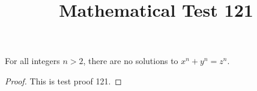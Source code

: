 \documentclass{amsart}
\begin{document}
\title{Mathematical Test 121}
\begin{theorem}
For all integers $n > 2$, there are no solutions to $x^n + y^n = z^n$.
\end{theorem}
\begin{proof}
This is test proof 121.
\end{proof}
\end{document}

